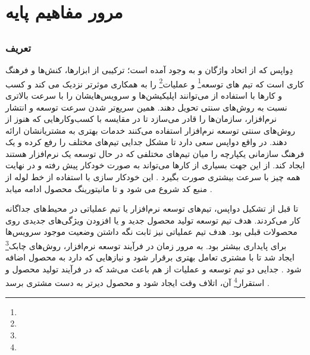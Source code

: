 \chapter{مرور مفاهیم پایه}

\section{}

\subsection{تعریف}
دِواپس که از اتحاد واژگان 
 و
به وجود آمده است؛ ترکیبی از ابزارها، کنش‌ها و فرهنگ کاری است که تیم های توسعه\footnote{} و عملیات\footnote{} را به همکاری موثرتر نزدیک می کند و کسب و کارها با استفاده از می‌توانند اپلیکیشن‌ها و سرویس‌هایشان را با سرعت بالاتری نسبت به روش‌های سنتی تحویل دهند. همین سریع‌تر شدن سرعت توسعه و انتشار نرم‌افزار، سازمان‌ها را قادر می‌سازد تا در مقایسه با کسب‌وکارهایی که هنوز از روش‌های سنتی توسعه نرم‌افزار استفاده می‌کنند خدمات بهتری به مشتریانشان ارائه دهند. در واقع دواپس سعی دارد تا مشکل جدایی تیم‌های مختلف را رفع کرده و یک فرهنگ سازمانی یکپارچه را میان تیم‌های مختلفی که در حال توسعه یک نرم‌افزار هستند ایجاد کند. از این جهت بسیاری از کارها می‌تواند به صورت خودکار پیش رفته و در نهایت همه چیز با سرعت بیشتری صورت بگیرد \cite{DevopsDef1,DevopsDef2}. این خودکار سازی با استفاده از خط لوله
از منبع کد شروع می شود و تا مانیتورینگ محصول ادامه میابد \cite{DevopsCICD1}.

تا قبل از تشکیل دواپس، تیم‌های توسعه نرم‌افزار یا تیم عملیاتی در محیط‌های جداگانه کار می‌کردند. هدف تیم توسعه تولید محصول جدید و یا افزودن ویژگی‌های جدیدی روی محصولات قبلی بود. هدف تیم عملیاتی نیز ثابت نگه داشتن وضعیت موجود سرویس‌ها برای پایداری بیشتر بود. به مرور زمان در فرآیند توسعه نرم‌افزار، روش‌های چابک\footnote{}
ایجاد شد تا با مشتری تعامل بهتری برقرار شود و نیازهایی که دارد به محصول اضافه شود \cite{DevopsAgile}. جدایی دو تیم توسعه و عملیات از هم باعث می‌شد که در فرآیند تولید محصول و استقرار\footnote{} آن، اتلاف وقت ایجاد شود و محصول دیرتر به دست مشتری برسد \cite{DevopsCD}.

